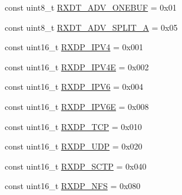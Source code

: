 \begin{DoxyCompactItemize}
\item 
const uint8\_\-t \hyperlink{namespaceiGbReg_ad3aad4627ec1e57dbc49e8ddf0e8c10b}{RXDT\_\-ADV\_\-ONEBUF} = 0x01
\item 
const uint8\_\-t \hyperlink{namespaceiGbReg_a86ad221aa778dcbb0f9c59fbdd29b652}{RXDT\_\-ADV\_\-SPLIT\_\-A} = 0x05
\item 
const uint16\_\-t \hyperlink{namespaceiGbReg_a38d1a85169979c3aa9b416e264fc61cc}{RXDP\_\-IPV4} = 0x001
\item 
const uint16\_\-t \hyperlink{namespaceiGbReg_a42c5ab6a6309d0493c5507c429f072a2}{RXDP\_\-IPV4E} = 0x002
\item 
const uint16\_\-t \hyperlink{namespaceiGbReg_acc96df3ea896c51031535f11e0beac6a}{RXDP\_\-IPV6} = 0x004
\item 
const uint16\_\-t \hyperlink{namespaceiGbReg_af42fc69035a6c21ed4d4e41df83981a2}{RXDP\_\-IPV6E} = 0x008
\item 
const uint16\_\-t \hyperlink{namespaceiGbReg_a3194c61cd3bbfba3e0c2002e3bc370f5}{RXDP\_\-TCP} = 0x010
\item 
const uint16\_\-t \hyperlink{namespaceiGbReg_a8bb50a93437adde2602f7501247099d0}{RXDP\_\-UDP} = 0x020
\item 
const uint16\_\-t \hyperlink{namespaceiGbReg_a28e7a3b67c3706e10dbd04b178b8524c}{RXDP\_\-SCTP} = 0x040
\item 
const uint16\_\-t \hyperlink{namespaceiGbReg_a3c747907eaeaa934bead4cda74971708}{RXDP\_\-NFS} = 0x080
\end{DoxyCompactItemize}


